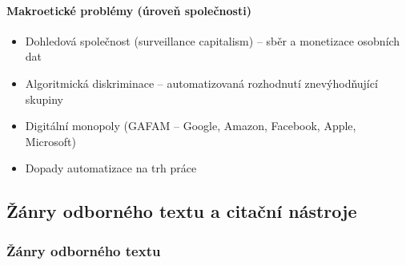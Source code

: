 \paragraph{Makroetické problémy (úroveň společnosti)}
\begin{itemize}
  \item Dohledová společnost (surveillance capitalism) -- sběr a monetizace osobních dat
  \item Algoritmická diskriminace -- automatizovaná rozhodnutí znevýhodňující skupiny
  \item Digitální monopoly (GAFAM -- Google, Amazon, Facebook, Apple, Microsoft)
  \item Dopady automatizace na trh práce
\end{itemize}

\subsection{Žánry odborného textu a citační nástroje}

\subsubsection{Žánry odborného textu}

